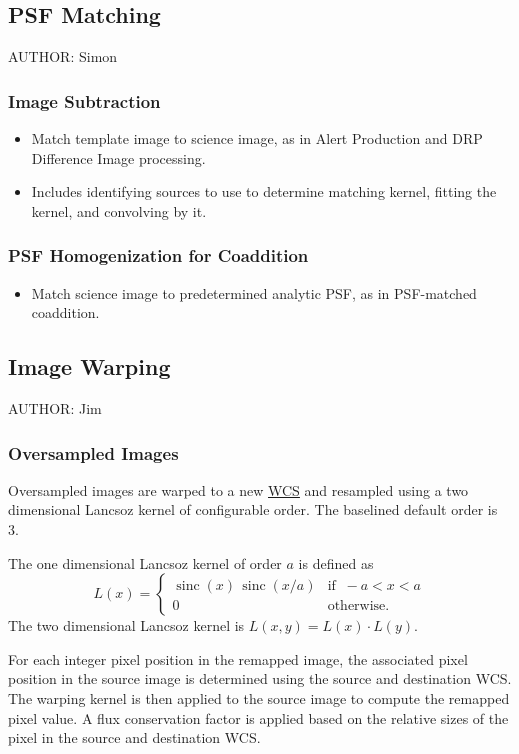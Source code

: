 \subsection{PSF Matching}
\label{sec:acPSFMatching}
AUTHOR: Simon
\subsubsection{Image Subtraction}
\label{sec:acImageSubtraction}
\begin{itemize}
\item Match template image to science image, as in Alert Production and DRP Difference Image processing.
\item Includes identifying sources to use to determine matching kernel, fitting the kernel, and convolving by it.
\end{itemize}
\subsubsection{PSF Homogenization for Coaddition}
\label{sec:acPSFHomogenization}
\begin{itemize}
\item Match science image to predetermined analytic PSF, as in PSF-matched coaddition.
\end{itemize}

\subsection{Image Warping}
\label{sec:acWarping}
AUTHOR: Jim
\subsubsection{Oversampled Images}
\label{sec:acOversampledWarping}

Oversampled images are warped to a new \hyperref[sec:spWCS]{WCS} and resampled using a two dimensional Lancsoz kernel of configurable order. The baselined default order is 3.

The one dimensional Lancsoz kernel of order $a$ is defined as
\[
L(x) = \begin{cases}
       \operatorname{sinc}(x)\, \operatorname{sinc}(x/a) & \text{if}\;\; -a < x < a\\ 0 & \text{otherwise.}
       \end{cases}
\]
The two dimensional Lancsoz kernel is $L(x, y) = L(x) \cdot L(y)$.

For each integer pixel position in the remapped image, the associated pixel position in the source image is determined using the source and destination WCS. The warping kernel is then applied to the source image to compute the remapped pixel value. A flux conservation factor is applied based on the relative sizes of the pixel in the source and destination WCS.

